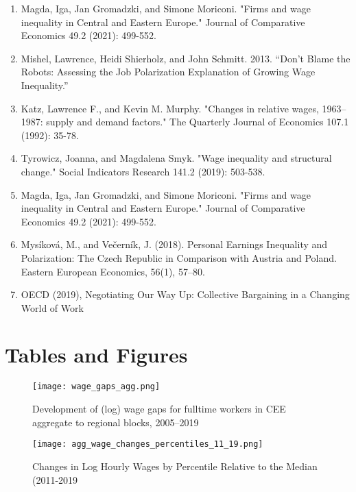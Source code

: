 \documentclass{article}
\begin{document}
\begin{enumerate}
\item Magda, Iga, Jan Gromadzki, and Simone Moriconi. "Firms and wage inequality in Central and Eastern Europe." Journal of Comparative Economics 49.2 (2021): 499-552.

\item Mishel, Lawrence, Heidi Shierholz, and John Schmitt. 2013. “Don’t Blame the Robots: Assessing the Job Polarization Explanation of Growing Wage Inequality.”

\item Katz, Lawrence F., and Kevin M. Murphy. "Changes in relative wages, 1963–1987: supply and demand factors." The Quarterly Journal of Economics 107.1 (1992): 35-78.

\item Tyrowicz, Joanna, and Magdalena Smyk. "Wage inequality and structural change." Social Indicators Research 141.2 (2019): 503-538.

\item Magda, Iga, Jan Gromadzki, and Simone Moriconi. "Firms and wage inequality in Central and Eastern Europe." Journal of Comparative Economics 49.2 (2021): 499-552.

\item Mysíková, M., and Večerník, J. (2018). Personal Earnings Inequality and Polarization: The Czech Republic in Comparison with Austria and Poland. Eastern European Economics, 56(1), 57–80.

\item OECD (2019), Negotiating Our Way Up: Collective Bargaining in a Changing World of Work

\end{enumerate}
\section{Tables and Figures}


\begin{figure}[!htbp]%
    \centering
    {\texttt{[image: wage\_gaps\_agg.png]} }
    \caption{Development of (log) wage gaps for fulltime workers in CEE aggregate to regional blocks,  2005–2019}
    \label{agg_wage_gaps_CEE}
\end{figure}



\begin{figure}[!htbp]%
    \centering
    {\texttt{[image: agg\_wage\_changes\_percentiles\_11\_19.png]} }
    \caption{Changes in Log Hourly Wages by Percentile Relative to the Median (2011-2019}
    \label{agg_wage_changes_percentiles_11_19}
\end{figure}
\end{document}
